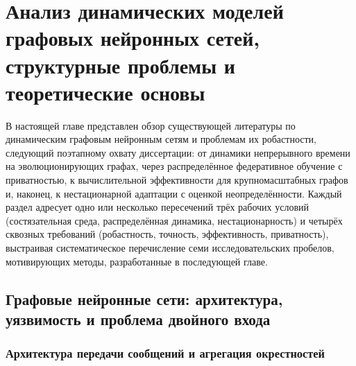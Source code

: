 
\chapter{Анализ динамических моделей графовых нейронных сетей, структурные проблемы и теоретические основы}
\label{ch:literature}

В настоящей главе представлен обзор существующей литературы по динамическим графовым нейронным сетям и проблемам их робастности, следующий поэтапному охвату диссертации: от динамики непрерывного времени на эволюционирующих графах, через распределённое федеративное обучение с приватностью, к вычислительной эффективности для крупномасштабных графов и, наконец, к нестационарной адаптации с оценкой неопределённости. Каждый раздел адресует одно или несколько пересечений трёх рабочих условий (состязательная среда, распределённая динамика, нестационарность) и четырёх сквозных требований (робастность, точность, эффективность, приватность), выстраивая систематическое перечисление семи исследовательских пробелов, мотивирующих методы, разработанные в последующей главе.


\section{Графовые нейронные сети: архитектура, уязвимость и проблема двойного входа}
\label{sec:gnn_vulnerability}

\subsection{Архитектура передачи сообщений и агрегация окрестностей}

